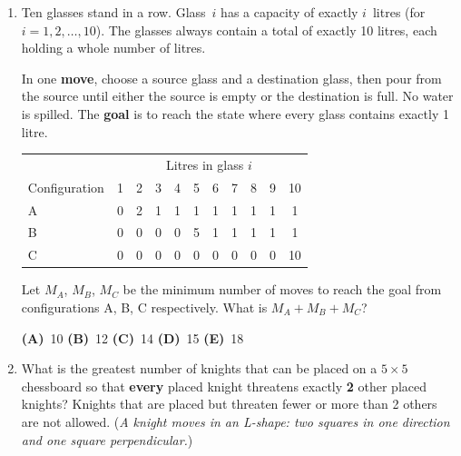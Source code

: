 \documentclass[a4paper,12pt]{article}
\newcommand{\hchoices}[5]{%
  \par\vspace{5pt}%
  \noindent\hspace{2em}%
  \textbf{(A)}~#1\hfill%
  \textbf{(B)}~#2\hfill%
  \textbf{(C)}~#3\hfill%
  \textbf{(D)}~#4\hfill%
  \textbf{(E)}~#5\par%
  \vspace{4pt}%
}
\newenvironment{choices}{%
  \begin{enumerate}[label=\textbf{(\Alph*)},
                    leftmargin=2.5em,
                    itemsep=2pt,
                    topsep=4pt,
                    parsep=0pt]%
}{%
  \end{enumerate}%
}
\begin{document}
\begin{enumerate}[label=\textbf{Q\arabic*.},
                  itemsep=3.5ex,
                  leftmargin=3.8em,
                  parsep=0pt,
                  start=13]
Both players play \textbf{optimally}: each always makes the move that
guarantees their own win if a winning strategy exists; otherwise, the move
that makes things hardest for the opponent.

Alice goes first. Who wins, and what first move should they make (if applicable)?

\begin{choices}
  \item Alice wins by removing 1 stone.
  \item Alice wins by removing 3 stones.
  \item Alice wins by removing 4 stones.
  \item Bob wins; no first move by Alice can guarantee her a win.
  \item The game is a draw under optimal play.
\end{choices}

\item Ten glasses stand in a row. Glass~$i$ has a capacity of exactly
$i$~litres (for $i=1,2,\ldots,10$). The glasses always contain a total of
exactly 10 litres, each holding a whole number of litres.

In one \textbf{move}, choose a source glass and a destination glass, then
pour from the source until either the source is empty or the destination is
full. No water is spilled. The \textbf{goal} is to reach the state where
every glass contains exactly 1 litre.

\medskip
\begin{center}
\begin{tabular}{lcccccccccc}
  \toprule
   & \multicolumn{10}{c}{Litres in glass $i$} \\
  \cmidrule(l){2-11}
  Configuration & 1 & 2 & 3 & 4 & 5 & 6 & 7 & 8 & 9 & 10 \\
  \midrule
  A & 0 & 2 & 1 & 1 & 1 & 1 & 1 & 1 & 1 & 1 \\
  B & 0 & 0 & 0 & 0 & 5 & 1 & 1 & 1 & 1 & 1 \\
  C & 0 & 0 & 0 & 0 & 0 & 0 & 0 & 0 & 0 & 10 \\
  \bottomrule
\end{tabular}
\end{center}
\medskip

Let $M_A$, $M_B$, $M_C$ be the minimum number of moves to reach the goal from
configurations A, B, C respectively. What is $M_A + M_B + M_C$?

\hchoices{10}{12}{14}{15}{18}

\item What is the greatest number of knights that can be placed on a
$5{\times}5$ chessboard so that \textbf{every} placed knight threatens
exactly \textbf{2} other placed knights? Knights that are placed but threaten
fewer or more than 2 others are not allowed.
(\emph{A knight moves in an L-shape: two squares in one direction and one
square perpendicular.})


\end{enumerate}
\end{document}
